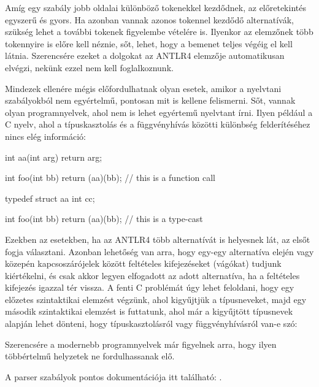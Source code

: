 \documentclass[12pt, a4paper]{report}
\begin{document}
Amíg egy szabály jobb oldalai különböző tokenekkel kezdődnek, az előretekintés egyszerű és gyors. Ha azonban vannak azonos tokennel kezdődő alternatívák, szükség lehet a további tokenek figyelembe vételére is. Ilyenkor az elemzőnek több tokennyire is előre kell néznie, sőt, lehet, hogy a bemenet teljes végéig el kell látnia. Szerencsére ezeket a dolgokat az ANTLR4 elemzője automatikusan elvégzi, nekünk ezzel nem kell foglalkoznunk.

Mindezek ellenére mégis előfordulhatnak olyan esetek, amikor a nyelvtani szabályokból nem egyértelmű, pontosan mit is kellene felismerni. Sőt, vannak olyan programnyelvek, ahol nem is lehet egyértemű nyelvtant írni. Ilyen például a C nyelv, ahol a típuskasztolás és a függvényhívás közötti különbség felderítéséhez nincs elég információ:

\begin{ccode}
int aa(int arg) {
	return arg;
}

int foo(int bb) {
	return (aa)(bb); // this is a function call
}
\end{ccode}

\begin{ccode}
typedef struct aa {
	int cc;
}

int foo(int bb) {
	return (aa)(bb); // this is a type-cast
}
\end{ccode}

Ezekben az esetekben, ha az ANTLR4 több alternatívát is helyesnek lát, az elsőt fogja választani. Azonban lehetőség van arra, hogy egy-egy alternatíva elején vagy közepén kapcsoszárójelek között feltételes kifejezéseket (vágókat) tudjunk kiértékelni, és csak akkor legyen elfogadott az adott alternatíva, ha a feltételes kifejezés igazzal tér vissza. A fenti C problémát úgy lehet feloldani, hogy egy előzetes szintaktikai elemzést végzünk, ahol kigyűjtjük a típusneveket, majd egy második szintaktikai elemzést is futtatunk, ahol már a kigyűjtött típusnevek alapján lehet dönteni, hogy típuskasztolásról vagy függvényhívásról van-e szó:


Szerencsére a modernebb programnyelvek már figyelnek arra, hogy ilyen többértelmű helyzetek ne fordulhassanak elő.

A parser szabályok pontos dokumentációja itt található: \cite{Antlr4Parser}.
\end{document}
